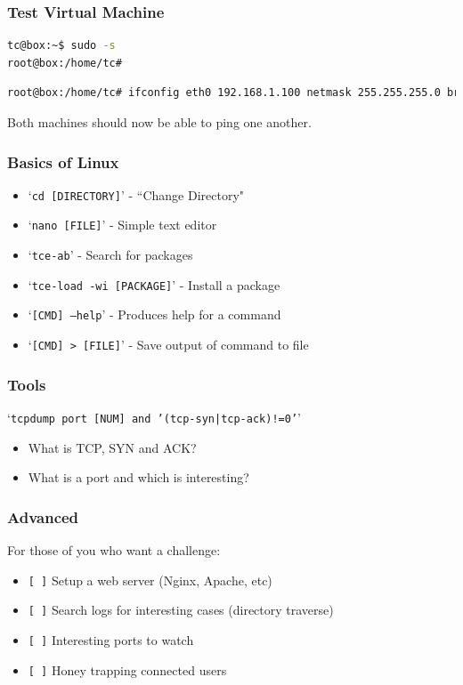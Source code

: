 \documentclass[10pt]{beamer}
\begin{document}
  \begin{frame}[fragile=singleslide]
    \frametitle{Test Virtual Machine}
    \centering
    \begin{lstlisting}[caption=Root Access,language=Bash]
tc@box:~$ sudo -s
root@box:/home/tc#
    \end{lstlisting}
    \begin{lstlisting}[caption=Setup Netork,language=Bash]
root@box:/home/tc# ifconfig eth0 192.168.1.100 netmask 255.255.255.0 broadcast 192.168.1.255 up
    \end{lstlisting}
    Both machines should now be able to ping one another.
  \end{frame}
  \begin{frame}
    \frametitle{Basics of Linux}
    \begin{itemize}
      \item `\texttt{cd [DIRECTORY]}' - ``Change Directory"
      \item `\texttt{nano [FILE]}' - Simple text editor
      \item `\texttt{tce-ab}' - Search for packages
      \item `\texttt{tce-load -wi [PACKAGE]}' - Install a package
      \item `\texttt{[CMD] --help}' - Produces help for a command
      \item `\texttt{[CMD] > [FILE]}' - Save output of command to file
    \end{itemize}
  \end{frame}
  \begin{frame}
    \frametitle{Tools}
    `\texttt{tcpdump port [NUM] and '(tcp-syn|tcp-ack)!=0'}'
    \begin{itemize}
      \item What is TCP, SYN and ACK?
      \item What is a port and which is interesting?
    \end{itemize}
  \end{frame}
  \begin{frame}
    \frametitle{Advanced}
    For those of you who want a challenge:
    \begin{itemize}
      \item \texttt{[ ]} Setup a web server (Nginx, Apache, etc)
      \item \texttt{[ ]} Search logs for interesting cases (directory traverse)
      \item \texttt{[ ]} Interesting ports to watch
      \item \texttt{[ ]} Honey trapping connected users
    \end{itemize}
  \end{frame}
\end{document}

